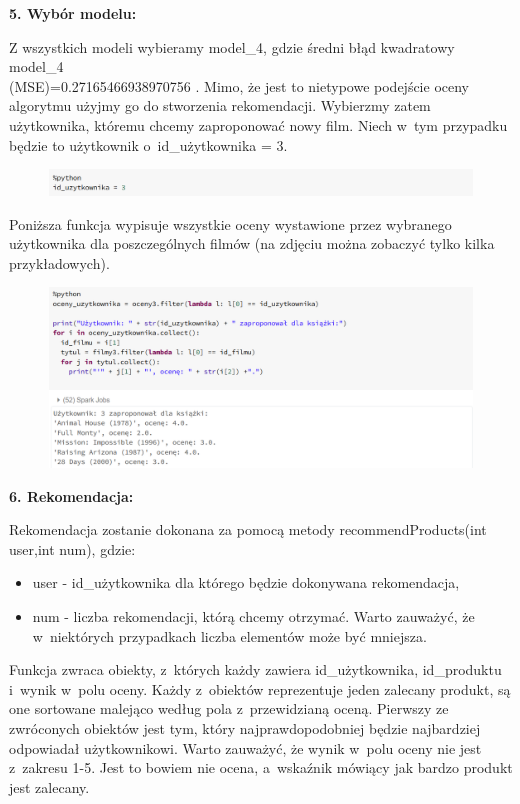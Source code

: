 \documentclass[12pt,a4paper]{report}
\begin{document}
\textbf{5. Wybór modelu:}

Z wszystkich modeli wybieramy model\_4, gdzie średni błąd kwadratowy model\_4 
\\(MSE)=0.27165466938970756 . Mimo, że jest to nietypowe podejście oceny algorytmu użyjmy go do stworzenia rekomendacji. Wybierzmy zatem użytkownika, któremu chcemy zaproponować nowy film. Niech w~tym przypadku będzie to użytkownik o~id\_użytkownika = 3.

\begin{figure}[H]
\includegraphics[scale=0.5]{obrazy/ALS15.PNG} 
\end{figure}

Poniższa funkcja wypisuje wszystkie oceny wystawione przez wybranego użytkownika dla poszczególnych filmów (na zdjęciu można zobaczyć tylko kilka przykładowych).

\begin{figure}[H]
\includegraphics[scale=0.5]{obrazy/ALS16.PNG} 
\end{figure}

\textbf{6. Rekomendacja:}

Rekomendacja zostanie dokonana za pomocą metody recommendProducts(int user,int num), gdzie:
\begin{itemize}
\item user - id\_użytkownika dla którego będzie dokonywana rekomendacja,
\item num - liczba rekomendacji, którą chcemy otrzymać. Warto zauważyć, że w~niektórych przypadkach liczba elementów może być mniejsza.
\end{itemize}

Funkcja zwraca obiekty, z~których każdy zawiera id\_użytkownika, id\_produktu i~wynik w~polu oceny. Każdy z~obiektów reprezentuje jeden zalecany produkt, są one sortowane malejąco według pola z~przewidzianą oceną. Pierwszy ze zwróconych obiektów jest tym, który najprawdopodobniej będzie najbardziej odpowiadał użytkownikowi. Warto zauważyć, że wynik w~polu oceny nie jest z~zakresu 1-5. Jest to bowiem nie ocena, a~wskaźnik mówiący jak bardzo produkt jest zalecany.
\end{document}

